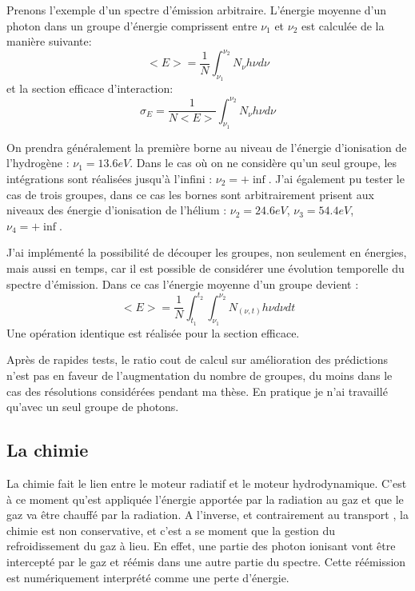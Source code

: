 Prenons l'exemple d'un spectre d'émission arbitraire.
L’énergie moyenne d'un photon dans un groupe d'énergie comprissent entre $\nu_1$ et $\nu_2$ est calculée de la manière suivante:
\begin{equation}
<E> = \frac{1}{N} \int_{\nu_1}^{\nu_2} N_\nu h \nu d\nu
\end{equation}
et la section efficace d'interaction:
\begin{equation}
\sigma_E = \frac{1}{N<E>} \int_{\nu_1}^{\nu_2} N_\nu h \nu d\nu
\end{equation}

On prendra généralement la première borne au niveau de l'énergie d'ionisation de l'hydrogène : $\nu_1=13.6eV$.
Dans le cas où on ne considère qu'un seul groupe, les intégrations sont réalisées jusqu'à l'infini : $\nu_2= + \inf$.
J'ai également pu tester le cas de trois groupes, dans ce cas les bornes sont arbitrairement prisent aux niveaux des énergie d'ionisation de l'hélium : 
$\nu_2= 24.6 eV$, $\nu_3= 54.4 eV $, $\nu_4= + \inf$.

J'ai implémenté la possibilité de découper les groupes, non seulement en énergies, mais aussi en temps, car il est possible de considérer une évolution temporelle du spectre d'émission.
Dans ce cas l'énergie moyenne d'un groupe devient : 
\begin{equation}
<E> = \frac{1}{N}  \int_{t_1}^{t_2}  \int_{\nu_1}^{\nu_2} N_{(\nu,t)} h \nu d\nu dt
\end{equation}
Une opération identique est réalisée pour la section efficace.

Après de rapides tests, le ratio cout de calcul sur amélioration des prédictions n'est pas en faveur de l'augmentation du nombre de groupes, du moins dans le cas des résolutions considérées pendant ma thèse.
En pratique je n'ai travaillé qu'avec un seul groupe de photons.

\subsection{La chimie}
\label{sec:chimie}

La chimie fait le lien entre le moteur radiatif et le moteur hydrodynamique.
C'est à ce moment qu'est appliquée l'énergie apportée par la radiation au gaz et que le gaz va être chauffé par la radiation.
A l'inverse, et contrairement au transport , la chimie est non conservative, et c'est a se moment que la gestion du refroidissement du gaz à lieu.
En effet, une partie des photon ionisant vont être intercepté par le gaz et réémis dans une autre partie du spectre.
Cette réémission est numériquement interprété comme une perte d'énergie.

